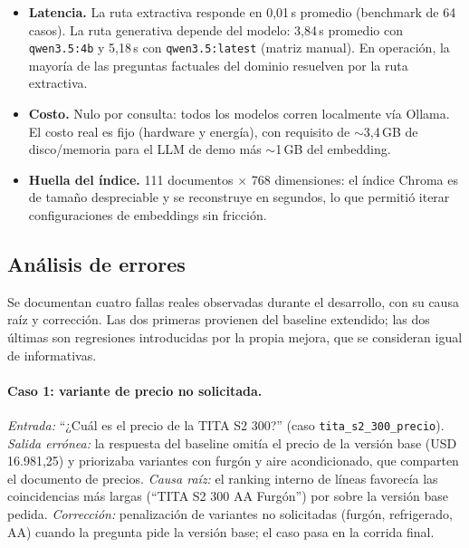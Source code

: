 \documentclass[11pt,a4paper]{article}
\newcommand{\code}[1]{\texttt{#1}}
\begin{document}
\begin{itemize}
    \item \textbf{Latencia.} La ruta extractiva responde en 0{,}01\,s
    promedio (benchmark de 64 casos). La ruta generativa depende del modelo:
    3{,}84\,s promedio con \code{qwen3.5:4b} y 5{,}18\,s con
    \code{qwen3.5:latest} (matriz manual). En operación, la mayoría de las
    preguntas factuales del dominio resuelven por la ruta extractiva.
    \item \textbf{Costo.} Nulo por consulta: todos los modelos corren
    localmente vía Ollama. El costo real es fijo (hardware y energía), con
    requisito de $\sim$3{,}4\,GB de disco/memoria para el LLM de demo más
    $\sim$1\,GB del embedding.
    \item \textbf{Huella del índice.} 111 documentos $\times$ 768 dimensiones:
    el índice Chroma es de tamaño despreciable y se reconstruye en segundos,
    lo que permitió iterar configuraciones de embeddings sin fricción.
\end{itemize}

\subsection{Análisis de errores}\label{sec:errores}

Se documentan cuatro fallas reales observadas durante el desarrollo, con su
causa raíz y corrección. Las dos primeras provienen del baseline extendido;
las dos últimas son regresiones introducidas por la propia mejora, que se
consideran igual de informativas.

\paragraph{Caso 1: variante de precio no solicitada.}
\emph{Entrada:} ``¿Cuál es el precio de la TITA S2 300?'' (caso
\code{tita\_s2\_300\_precio}). \emph{Salida errónea:} la respuesta del
baseline omitía el precio de la versión base (USD 16.981,25) y priorizaba
variantes con furgón y aire acondicionado, que comparten el documento de
precios. \emph{Causa raíz:} el ranking interno de líneas favorecía las
coincidencias más largas (``TITA S2 300 AA Furgón'') por sobre la versión
base pedida. \emph{Corrección:} penalización de variantes no solicitadas
(furgón, refrigerado, AA) cuando la pregunta pide la versión base; el caso
pasa en la corrida final.
\end{document}
